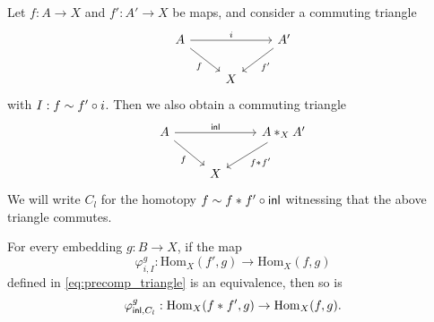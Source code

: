 Let $f:A\to X$ and $f':A'\to X$ be maps, and consider a commuting triangle
\begin{equation*}
\begin{tikzcd}
A \arrow[rr,"i"] \arrow[dr,swap,"f"] & & A' \arrow[dl,"{f'}"] \\
& X
\end{tikzcd}
\end{equation*}
with $I:f\sim f'\circ i$. Then we also obtain a commuting triangle
\begin{equation*}
\begin{tikzcd}
A \arrow[rr,"\inl"] \arrow[dr,swap,"f"] & & \join[X]{A}{A'} \arrow[dl,"{\join{f}{f'}}"] \\
& X
\end{tikzcd}
\end{equation*}
We will write $C_l$ for the homotopy $f\sim {f}\ast_{}{f'}\circ{\mathsf{inl}}$ witnessing that the
above triangle commutes.

\begin{lem}\label{lem:factor_join}
For every embedding $g:B\to X$, if the map
\begin{equation*}
\varphi^g_{i,I}: \mathrm{Hom}_X(f',g)\to\mathrm{Hom}_X(f,g)
\end{equation*}
defined in \autoref{eq:precomp_triangle} is an equivalence, then so is 
\begin{equation*}
\varphi^g_{{\mathsf{inl}},C_l}: \mathrm{Hom}_X({f}\ast_{}{f'},g)\to\mathrm{Hom}_X(f,g).
\end{equation*}
\end{lem}

